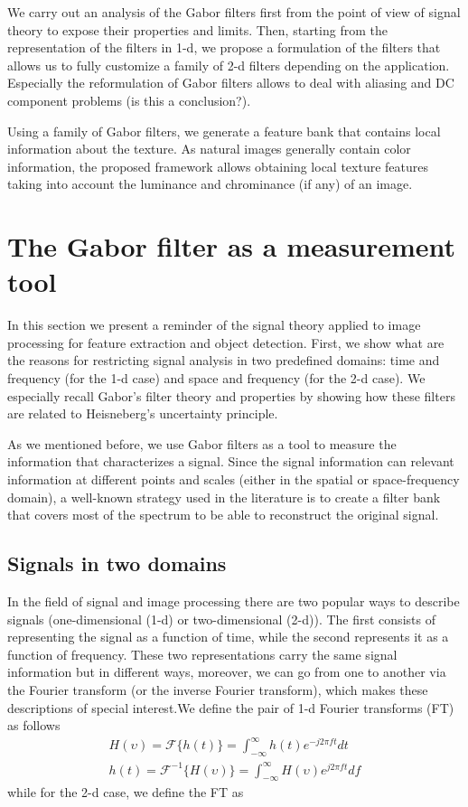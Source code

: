 We carry out an analysis of the Gabor filters first from the point of view of signal theory to expose their properties and limits. Then, starting from the representation of the filters in 1-d, we propose a formulation of the filters that allows us to fully customize a family of 2-d filters depending on the application. Especially the reformulation of Gabor filters allows to deal with aliasing and DC component problems (is this a conclusion?).

Using a family of Gabor filters, we generate a feature bank that contains local information about the texture. As natural images generally contain color information, the proposed framework allows obtaining local texture features taking into account the luminance and chrominance (if any) of an image.

\section{The Gabor filter as a measurement tool}\label{ch:gabor_filter_description}

In this section we present a reminder of the signal theory applied to image processing for feature extraction and object detection. First, we show what are the reasons for restricting signal analysis in two predefined domains: time and frequency (for the 1-d case) and space and frequency (for the 2-d case). We especially recall Gabor's filter theory and properties by showing how these filters are related to Heisneberg's uncertainty principle.

As we mentioned before, we use Gabor filters as a tool to measure the information that characterizes a signal. Since the signal information can relevant information at different points and scales (either in the spatial or space-frequency domain), a well-known strategy used in the literature is to create a filter bank that covers most of the spectrum to be able to reconstruct the original signal.

\subsection{Signals in two domains}
In the field of signal and image processing there are two popular ways to describe signals (one-dimensional (1-d) or two-dimensional (2-d)). The first consists of representing the signal as a function of time, while the second represents it as a function of frequency. These two representations carry the same signal information but in different ways, moreover, we can go from one to another via the Fourier transform (or the inverse Fourier transform), which makes these descriptions of special interest.We define the pair of 1-d Fourier transforms (FT) as follows
\begin{equation}\label{eq:fourier_transforms_1d}
    \begin{gathered}
        H(\upsilon) = \mathcal{F}\{h(t)\} = \int_{-\infty}^{\infty} h(t) e^{-j2\pi f t} dt \\
        h(t) = \mathcal{F}^{-1}\{H(\upsilon)\} = \int_{-\infty}^{\infty} H(\upsilon) e^{j2\pi f t} df 
    \end{gathered}
\end{equation}
while for the 2-d case, we define the FT as

